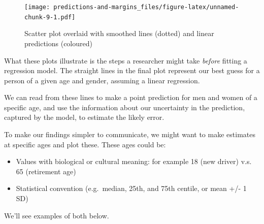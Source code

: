 \documentclass[]{article}
\newenvironment{Shaded}{\begin{snugshade}}{\end{snugshade}}
\newcommand{\DataTypeTok}[1]{\textcolor[rgb]{0.13,0.29,0.53}{#1}}
\newcommand{\DecValTok}[1]{\textcolor[rgb]{0.00,0.00,0.81}{#1}}
\newcommand{\FloatTok}[1]{\textcolor[rgb]{0.00,0.00,0.81}{#1}}
\newcommand{\KeywordTok}[1]{\textcolor[rgb]{0.13,0.29,0.53}{\textbf{#1}}}
\newcommand{\NormalTok}[1]{#1}
\newcommand{\OperatorTok}[1]{\textcolor[rgb]{0.81,0.36,0.00}{\textbf{#1}}}
\newcommand{\StringTok}[1]{\textcolor[rgb]{0.31,0.60,0.02}{#1}}
\providecommand{\tightlist}{%
  \setlength{\itemsep}{0pt}\setlength{\parskip}{0pt}}
\begin{document}
\begin{Shaded}
\end{Shaded}

\begin{figure}
\centering
\texttt{[image: predictions-and-margins\_files/figure-latex/unnamed-chunk-9-1.pdf]}
\caption{\label{fig:unnamed-chunk-9}Scatter plot overlaid with smoothed lines (dotted) and linear predictions (coloured)}
\end{figure}

What these plots illustrate is the steps a researcher might take \emph{before}
fitting a regression model. The straight lines in the final plot represent our
best guess for a person of a given age and gender, assuming a linear regression.

We can read from these lines to make a point prediction for men and women of a
specific age, and use the information about our uncertainty in the prediction,
captured by the model, to estimate the likely error.

To make our findings simpler to communicate, we might want to make estimates at
specific ages and plot these. These ages could be:

\begin{itemize}
\tightlist
\item
  Values with biological or cultural meaning: for example 18 (new driver) v.s.
  65 (retirement age)
\item
  Statistical convention (e.g.~median, 25th, and 75th centile, or mean +/- 1
  SD)
\end{itemize}

We'll see examples of both below.
\end{document}
